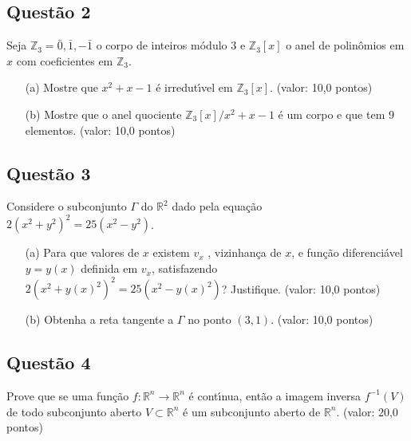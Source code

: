 \documentclass{report}
\begin{document}
\subsection{\color{blue} Quest\~ao 2}

Seja $\mathbb Z_3 = {\bar 0 , \bar 1 , -\bar 1}$ o corpo de inteiros m\'odulo $3$ e $\mathbb Z_3 [x]$ o anel de polinômios em $x$ com coeficientes em $\mathbb Z_3$.

\begin{enumerate}

\item[(a)] Mostre que $x^2 + x - 1$ \'e irredut\'\i vel em $\mathbb Z_3 [x]$. (valor: 10,0 pontos)

\item[(b)] Mostre que o anel quociente $\displaystyle {\mathbb Z_3 [x]}/{x^2 + x - 1}$ \'e um corpo e que tem $9$ elementos. (valor: 10,0 pontos)

\end{enumerate}

\subsection{\color{blue} Quest\~ao 3}

Considere o subconjunto $\Gamma$ do $\mathbb R^2$ dado pela equa\c c\~ao $2(x^2+ y^2)^2=25(x^2-y^2)$.

\begin{enumerate}

\item[(a)] Para que valores de $x$ existem $v_x$ , vizinhan\c ca de $x$, e fun\c c\~ao diferenci\'avel $y = y(x)$ definida em $v_x$, satisfazendo $2(x^2+ y(x)^2)^2=25 (x^2-y(x)^2)$? Justifique. (valor: 10,0 pontos) 

\item[(b)] Obtenha a reta tangente a $\Gamma$ no ponto $(3, 1)$.
(valor: 10,0 pontos)

\end{enumerate}

\subsection{\color{blue} Quest\~ao 4}

Prove que se uma fun\c c\~ao $f: \mathbb R^n \to \mathbb R^n$ \'e cont\'\i nua, ent\~ao a imagem inversa $f^{-1}(V)$ de todo subconjunto aberto $V \subset \mathbb R^n$  \'e um subconjunto aberto de $\mathbb R^n$. (valor: 20,0 pontos)
\end{document}
